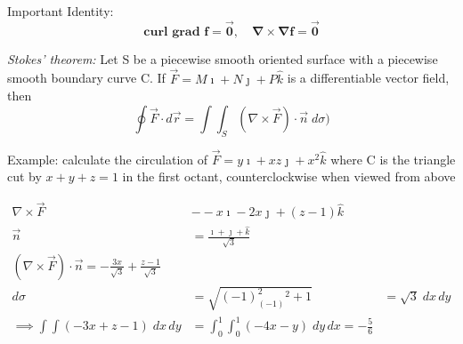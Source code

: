 \documentclass[12pt]{article}
\begin{document}
Important Identity:
\[\mathbf{\text{curl grad } f = \vec{0}, \quad \nabla \times \nabla f = \vec{0}}\]

\emph{Stokes' theorem:} Let S be a piecewise smooth oriented surface with a piecewise smooth boundary curve C. If $\vec{F} = M \imath + N \jmath + P \hat{k}$ is a differentiable vector field, then 
\[\oint \vec{F} \cdot d\vec{r} = \int \int_S (\nabla \times \vec{F}) \cdot \vec{n} \; d\sigma)\]

Example: calculate the circulation of $\vec{F} = y\imath + xz\jmath + x^2 \hat{k}$ where C is the triangle cut by $x+y+z=1$ in the first octant, counterclockwise when viewed from above

\begin{align*}
    \nabla \times \vec{F} &- -x\imath -2x\jmath + (z-1) \hat{k}\\
    \vec{n} &= \frac{\imath + \jmath + \hat{k}}{\sqrt{3}}\\ 
    (\nabla \times \vec{F}) \cdot \vec{n} = -\frac{3x}{\sqrt{3}} + \frac{z - 1}{\sqrt{3}}\\
    d\sigma &= \sqrt{(-1)^2 _ (-1)^2 + 1} &= \sqrt{3} \; dx\, dy\\
    \implies \int \int(-3x + z - 1)\; dx\, dy &= \int_0^1 \int_0^1 (-4x-y) \; dy\, dx =  -\frac{5}{6}
\end{align*}
\end{document}
